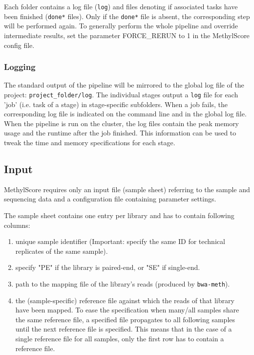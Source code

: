 \documentclass{article}
\begin{document}
 Each folder contains a log file (\verb|log|) and files denoting if associated tasks have been finished (\verb|done*| files). Only if the \verb|done*| file is absent, the corresponding step will be performed again. To generally perform the whole pipeline and override intermediate results, set the parameter FORCE\_RERUN to 1 in the MethylScore config file.
 
 \subsubsection*{Logging}
 
 The standard output of the pipeline will be mirrored to the global log file of the project: \verb|project_folder/log|.
 The individual stages output a \verb|log| file for each 'job' (i.e. task of a stage) in stage-specific subfolders. When a job fails, the corresponding log file is indicated on the command line and in the global log file. When the pipeline is run on the cluster, the log files contain the peak memory usage and the runtime after the job finished. This information can be used to tweak the time and memory specifications for each stage.
 


\subsection{Input}
\label{input}

MethylScore requires only an input file (sample sheet) referring to the sample and sequencing data and a configuration file containing parameter settings.

The sample sheet contains one entry per library and has to contain following columns:
\begin{enumerate}
	\item unique sample identifier (Important: specify the same ID for technical replicates of the same sample).
	\item specify "PE" if the library is paired-end, or "SE" if single-end.
	\item path to the mapping file of the library's reads (produced by \verb|bwa-meth|).
	\item the (sample-specific) reference file against which the reads of that library have been mapped. To ease the specification when many/all samples share the same reference file, a specified file propagates to all following samples until the next reference file is specified. This means that in the case of a single reference file for all samples, only the first row has to contain a reference file.
\end{enumerate}
\end{document}
